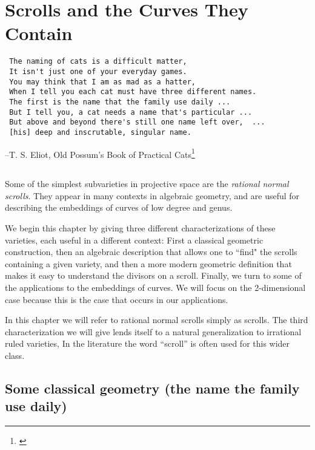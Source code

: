 

\chapter{Scrolls and the Curves They Contain}
\label{ScrollsChapter}


\begin{verbatim}
 The naming of cats is a difficult matter,
 It isn't just one of your everyday games.
 You may think that I am as mad as a hatter,
 When I tell you each cat must have three different names.
 The first is the name that the family use daily ...
 But I tell you, a cat needs a name that's particular ...
 But above and beyond there's still one name left over,  ...
 [his] deep and inscrutable, singular name.
\end{verbatim}
--T. S. Eliot, Old Possum's Book of Practical Cats\footnote{\cite{PracticalCats}}

\section*{}
Some of the simplest subvarieties in projective space are the \emph{rational normal scrolls}. They appear in many contexts in algebraic geometry, and are useful for describing the embeddings of curves of low degree and genus. 

We begin this chapter by giving three different characterizations of these varieties, each useful in a different context: First a classical geometric construction, then an algebraic description that allows one to ``find" the scrolls containing a given variety, and then a more modern geometric definition that makes it easy to understand the divisors on a scroll. Finally, we turn to some of the applications to the embeddings of curves. We will focus on the 2-dimensional case because this is the case that occurs in our applications.

In this chapter we will refer to rational normal scrolls simply as scrolls. The third characterization we will give lends itself to a natural generalization to  irrational ruled varieties, In the literature the word ``scroll'' is often used for this wider class.

\section{Some classical geometry (the name the family use daily)}\label{daily name}

